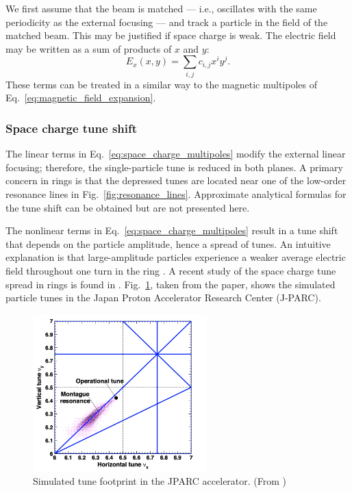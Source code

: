 We first assume that the beam is matched — i.e., oscillates with the same periodicity as the external focusing — and track a particle in the field of the matched beam. This may be justified if space charge is weak. The electric field may be written as a sum of products of $x$ and $y$:
%
\begin{equation}\label{eq:space_charge_multipoles}
    E_x(x, y) = \sum_{i, j}{c_{i, j} x^i y^j}.
\end{equation}
%
These terms can be treated in a similar way to the magnetic multipoles of Eq.~\eqref{eq:magnetic_field_expansion}.


\subsubsection{Space charge tune shift}

The linear terms in Eq.~\eqref{eq:space_charge_multipoles} modify the external linear focusing; therefore, the single-particle tune is reduced in both planes. A primary concern in rings is that the depressed tunes are located near one of the low-order resonance lines in Fig.~\ref{fig:resonance_lines}. Approximate analytical formulas for the tune shift can be obtained \cite{Ng2005} but are not presented here.

The nonlinear terms in Eq.~\eqref{eq:space_charge_multipoles} result in a tune shift that depends on the particle amplitude, hence a spread of tunes. An intuitive explanation is that large-amplitude particles experience a weaker average electric field throughout one turn in the ring \cite{Franchetti2017}. A recent study of the space charge tune spread in rings is found in \cite{Hotchi2020}. Fig.~\ref{fig:jparc_montague}, taken from the paper, shows the simulated particle tunes in the Japan Proton Accelerator Research Center (J-PARC).
%
\begin{figure}[!p]
    \centering
    \includegraphics[width=0.6\textwidth]{Images/chapter1/montague.png}
    \caption{Simulated tune footprint in the JPARC accelerator. (From \cite{Hotchi2020})}
    \label{fig:jparc_montague}
\end{figure}
%

